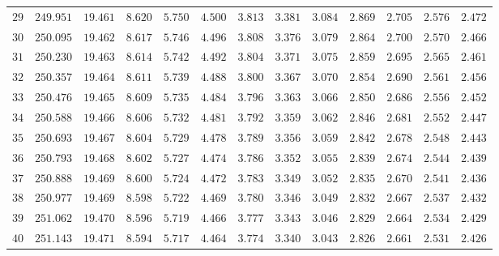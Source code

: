 \begin{tabular}{rrrrrrrrrrrrr}
  $29$ & $249.951$ & $19.461$ & $8.620$ & $5.750$ & $4.500$ & $3.813$ & $3.381$ & $3.084$ & $2.869$ & $2.705$ & $2.576$ & $2.472$ \\ 
  $30$ & $250.095$ & $19.462$ & $8.617$ & $5.746$ & $4.496$ & $3.808$ & $3.376$ & $3.079$ & $2.864$ & $2.700$ & $2.570$ & $2.466$ \\ 
  $31$ & $250.230$ & $19.463$ & $8.614$ & $5.742$ & $4.492$ & $3.804$ & $3.371$ & $3.075$ & $2.859$ & $2.695$ & $2.565$ & $2.461$ \\ 
  $32$ & $250.357$ & $19.464$ & $8.611$ & $5.739$ & $4.488$ & $3.800$ & $3.367$ & $3.070$ & $2.854$ & $2.690$ & $2.561$ & $2.456$ \\ 
  $33$ & $250.476$ & $19.465$ & $8.609$ & $5.735$ & $4.484$ & $3.796$ & $3.363$ & $3.066$ & $2.850$ & $2.686$ & $2.556$ & $2.452$ \\ 
  $34$ & $250.588$ & $19.466$ & $8.606$ & $5.732$ & $4.481$ & $3.792$ & $3.359$ & $3.062$ & $2.846$ & $2.681$ & $2.552$ & $2.447$ \\ 
  $35$ & $250.693$ & $19.467$ & $8.604$ & $5.729$ & $4.478$ & $3.789$ & $3.356$ & $3.059$ & $2.842$ & $2.678$ & $2.548$ & $2.443$ \\ 
  $36$ & $250.793$ & $19.468$ & $8.602$ & $5.727$ & $4.474$ & $3.786$ & $3.352$ & $3.055$ & $2.839$ & $2.674$ & $2.544$ & $2.439$ \\ 
  $37$ & $250.888$ & $19.469$ & $8.600$ & $5.724$ & $4.472$ & $3.783$ & $3.349$ & $3.052$ & $2.835$ & $2.670$ & $2.541$ & $2.436$ \\ 
  $38$ & $250.977$ & $19.469$ & $8.598$ & $5.722$ & $4.469$ & $3.780$ & $3.346$ & $3.049$ & $2.832$ & $2.667$ & $2.537$ & $2.432$ \\ 
  $39$ & $251.062$ & $19.470$ & $8.596$ & $5.719$ & $4.466$ & $3.777$ & $3.343$ & $3.046$ & $2.829$ & $2.664$ & $2.534$ & $2.429$ \\ 
  $40$ & $251.143$ & $19.471$ & $8.594$ & $5.717$ & $4.464$ & $3.774$ & $3.340$ & $3.043$ & $2.826$ & $2.661$ & $2.531$ & $2.426$ \\ 
   \hline
\end{tabular}
